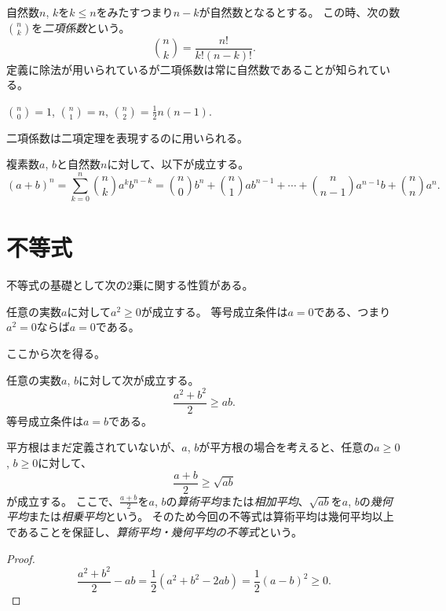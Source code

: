 自然数$n$, $k$を$k \le n$をみたすつまり$n-k$が自然数となるとする。
この時、次の数$\binom{n}{k}$を\emph{二項係数}という。
$$
\binom{n}{k} = \frac{n!}{k!(n-k)!}.
$$
定義に除法が用いられているが二項係数は常に自然数であることが知られている。

\begin{example}
$\binom{n}{0} = 1$, $\binom{n}{1} = n$, $\binom{n}{2} = \frac{1}{2}n(n-1)$.
\end{example}

二項係数は二項定理を表現するのに用いられる。

\begin{proposition}[二項定理]
複素数$a$, $b$と自然数$n$に対して、以下が成立する。
$$
(a+b)^n = \sum_{k = 0}^n \binom{n}{k}a^k b^{n-k} = \binom{n}{0}b^n+\binom{n}{1}a b^{n-1}+\cdots+\binom{n}{n-1}a^{n-1}b+\binom{n}{n}a^n.
$$
\end{proposition}

\section{不等式}

不等式の基礎として次の$2$乗に関する性質がある。

\begin{proposition}
任意の実数$a$に対して$a^2 \ge 0$が成立する。
等号成立条件は$a = 0$である、つまり$a^2 = 0$ならば$a = 0$である。
\end{proposition}

ここから次を得る。

\begin{proposition}
任意の実数$a$, $b$に対して次が成立する。
$$
\frac{a^2+b^2}{2} \ge a b.
$$
等号成立条件は$a = b$である。
\end{proposition}

\begin{remark}
平方根はまだ定義されていないが、$a$, $b$が平方根の場合を考えると、任意の$a \ge 0$, $b \ge 0$に対して、
$$
\frac{a+b}{2} \ge \sqrt{a b}
$$
が成立する。
ここで、$\frac{a+b}{2}$を$a$, $b$の\emph{算術平均}または\emph{相加平均}、$\sqrt{a b}$を$a$, $b$の\emph{幾何平均}または\emph{相乗平均}という。
そのため今回の不等式は算術平均は幾何平均以上であることを保証し、\emph{算術平均・幾何平均の不等式}という。
\end{remark}

\begin{proof}
$$
\frac{a^2+b^2}{2}-a b
= \frac{1}{2}(a^2+b^2-2 a b)
= \frac{1}{2}(a-b)^2 \ge 0.
$$
\end{proof}
